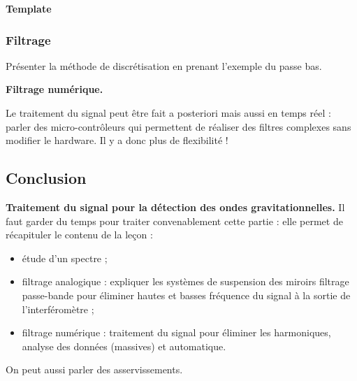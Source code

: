 \begin{transition}
\textbf{Template}
\end{transition}

\subsubsection{Filtrage}

Présenter la méthode de discrétisation en prenant l'exemple du passe bas.

\begin{slide}
\textbf{Filtrage numérique.}
\end{slide}

Le traitement du signal peut être fait a posteriori mais aussi en temps réel : parler des micro-contrôleurs qui permettent de réaliser des filtres complexes sans modifier le hardware.
Il y a donc plus de flexibilité !

\subsection*{Conclusion}

\begin{slide}
\textbf{Traitement du signal pour la détection des ondes gravitationnelles.}
Il faut garder du temps pour traiter convenablement cette partie : elle permet de récapituler le contenu de la leçon :
\begin{itemize}
\item étude d'un spectre ;
\item filtrage analogique : expliquer les systèmes de suspension des miroirs filtrage passe-bande pour éliminer hautes et basses fréquence du signal à la sortie de l'interféromètre ;
\item filtrage numérique : traitement du signal pour éliminer les harmoniques, analyse des données (massives) et automatique.
\end{itemize}
\end{slide}

On peut aussi parler des asservissements.

\newpage